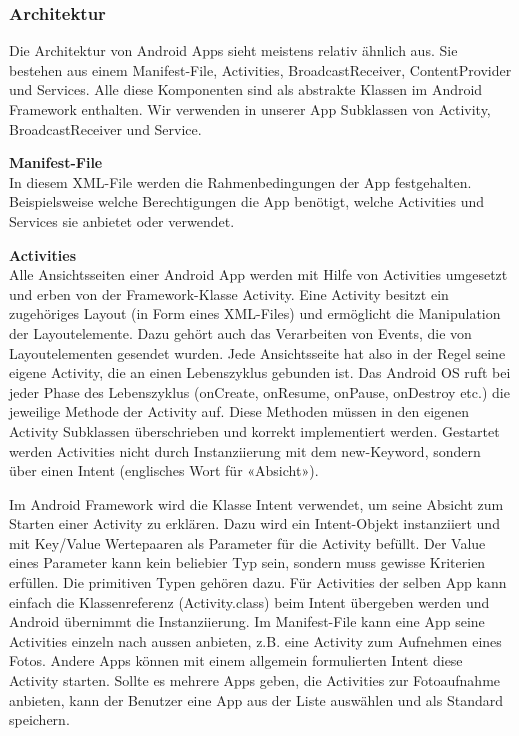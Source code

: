 \subsubsection{Architektur}
\label{sec:androidArchSolution}
Die Architektur von Android Apps sieht meistens relativ ähnlich aus. Sie bestehen aus einem Manifest-File, Activities, BroadcastReceiver, ContentProvider und Services. Alle diese Komponenten sind als abstrakte Klassen im Android Framework enthalten. Wir verwenden in unserer App Subklassen von Activity, BroadcastReceiver und Service.

\textbf{Manifest-File}\\
In diesem XML-File werden die Rahmenbedingungen der App festgehalten. Beispielsweise welche Berechtigungen die App benötigt, welche Activities und Services sie anbietet oder verwendet.

\textbf{Activities}\\
Alle Ansichtsseiten einer Android App werden mit Hilfe von Activities umgesetzt und erben von der Framework-Klasse Activity. Eine Activity besitzt ein zugehöriges Layout (in Form eines XML-Files) und ermöglicht die Manipulation der Layoutelemente. Dazu gehört auch das Verarbeiten von Events, die von Layoutelementen gesendet wurden. Jede Ansichtsseite hat also in der Regel seine eigene Activity, die an einen Lebenszyklus gebunden ist. Das Android OS ruft bei jeder Phase des Lebenszyklus (onCreate, onResume, onPause, onDestroy etc.) die jeweilige Methode der Activity auf. Diese Methoden müssen in den eigenen Activity Subklassen überschrieben und korrekt implementiert werden. Gestartet werden Activities nicht durch Instanziierung mit dem new-Keyword, sondern über einen Intent (englisches Wort für «Absicht»). 

Im Android Framework wird die Klasse Intent verwendet, um seine Absicht zum Starten einer Activity zu erklären. Dazu wird ein Intent-Objekt instanziiert und mit Key/Value Wertepaaren als Parameter für die Activity befüllt. Der Value eines Parameter kann kein beliebier Typ sein, sondern muss gewisse Kriterien erfüllen. Die primitiven Typen gehören dazu. Für Activities der selben App kann einfach die Klassenreferenz (Activity.class) beim Intent übergeben werden und Android übernimmt die Instanziierung. Im Manifest-File kann eine App seine Activities einzeln nach aussen anbieten, z.B. eine Activity zum Aufnehmen eines Fotos. Andere Apps können mit einem allgemein formulierten Intent diese Activity starten. Sollte es mehrere Apps geben, die Activities zur Fotoaufnahme anbieten, kann der Benutzer eine App aus der Liste auswählen und als Standard speichern.

